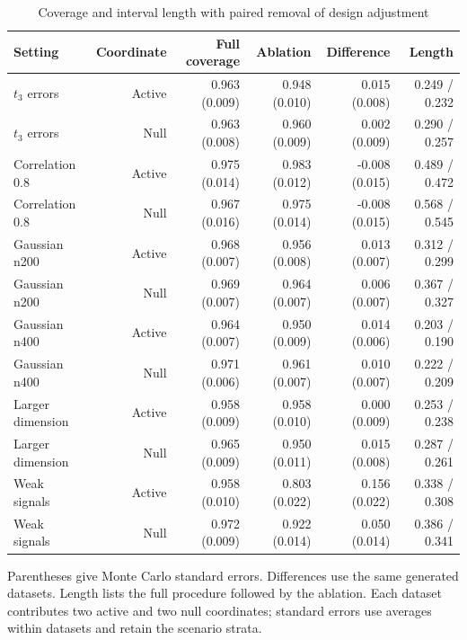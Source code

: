 \begin{table}[t]
\caption{Coverage and interval length with paired removal of design adjustment}\label{tab:joint-simulation}
\centering\small
\begin{tabular}{lrrrrr}
\toprule
Setting & Coordinate & Full coverage & Ablation & Difference & Length \\
\midrule
$t_3$ errors & Active & 0.963 (0.009) & 0.948 (0.010) & 0.015 (0.008) & 0.249 / 0.232 \\
$t_3$ errors & Null & 0.963 (0.008) & 0.960 (0.009) & 0.002 (0.009) & 0.290 / 0.257 \\
Correlation 0.8 & Active & 0.975 (0.014) & 0.983 (0.012) & -0.008 (0.015) & 0.489 / 0.472 \\
Correlation 0.8 & Null & 0.967 (0.016) & 0.975 (0.014) & -0.008 (0.015) & 0.568 / 0.545 \\
Gaussian n200 & Active & 0.968 (0.007) & 0.956 (0.008) & 0.013 (0.007) & 0.312 / 0.299 \\
Gaussian n200 & Null & 0.969 (0.007) & 0.964 (0.007) & 0.006 (0.007) & 0.367 / 0.327 \\
Gaussian n400 & Active & 0.964 (0.007) & 0.950 (0.009) & 0.014 (0.006) & 0.203 / 0.190 \\
Gaussian n400 & Null & 0.971 (0.006) & 0.961 (0.007) & 0.010 (0.007) & 0.222 / 0.209 \\
Larger dimension & Active & 0.958 (0.009) & 0.958 (0.010) & 0.000 (0.009) & 0.253 / 0.238 \\
Larger dimension & Null & 0.965 (0.009) & 0.950 (0.011) & 0.015 (0.008) & 0.287 / 0.261 \\
Weak signals & Active & 0.958 (0.010) & 0.803 (0.022) & 0.156 (0.022) & 0.338 / 0.308 \\
Weak signals & Null & 0.972 (0.009) & 0.922 (0.014) & 0.050 (0.014) & 0.386 / 0.341 \\
\bottomrule
\end{tabular}
\par\smallskip\parbox{\textwidth}{\footnotesize Parentheses give Monte Carlo standard errors. Differences use the same generated datasets. Length lists the full procedure followed by the ablation. Each dataset contributes two active and two null coordinates; standard errors use averages within datasets and retain the scenario strata.}
\end{table}
